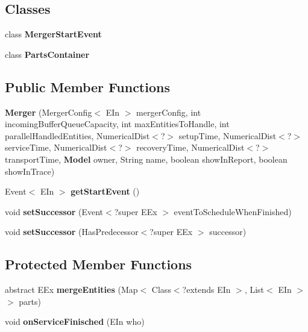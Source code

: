 \subsection*{Classes}
\begin{DoxyCompactItemize}
\item 
class {\bfseries Merger\-Start\-Event}
\item 
class {\bfseries Parts\-Container}
\end{DoxyCompactItemize}
\subsection*{Public Member Functions}
\begin{DoxyCompactItemize}
\item 
{\bf Merger} (Merger\-Config$<$ E\-In $>$ merger\-Config, int incoming\-Buffer\-Queue\-Capacity, int max\-Entities\-To\-Handle, int parallel\-Handled\-Entities, Numerical\-Dist$<$?$>$ setup\-Time, Numerical\-Dist$<$?$>$ service\-Time, Numerical\-Dist$<$?$>$ recovery\-Time, Numerical\-Dist$<$?$>$ transport\-Time, {\bf Model} owner, String name, boolean show\-In\-Report, boolean show\-In\-Trace)
\item 
Event$<$ E\-In $>$ {\bf get\-Start\-Event} ()
\item 
void {\bfseries set\-Successor} (Event$<$?super E\-Ex $>$ event\-To\-Schedule\-When\-Finished)\label{classdesmoj_1_1extensions_1_1chaining_1_1_merger_3_01_e_in_01extends_01_entity_00_01_e_ex_01extends_01_entity_01_4_af45910f12e1ac969e0b14c0f4295991e}

\item 
void {\bfseries set\-Successor} (Has\-Predecessor$<$?super E\-Ex $>$ successor)\label{classdesmoj_1_1extensions_1_1chaining_1_1_merger_3_01_e_in_01extends_01_entity_00_01_e_ex_01extends_01_entity_01_4_ac4fa63979c27f5237afbbda959cfc16c}

\end{DoxyCompactItemize}
\subsection*{Protected Member Functions}
\begin{DoxyCompactItemize}
\item 
abstract E\-Ex {\bf merge\-Entities} (Map$<$ Class$<$?extends E\-In $>$, List$<$ E\-In $>$$>$ parts)
\item 
void {\bf on\-Service\-Finisched} (E\-In who)
\end{DoxyCompactItemize}


